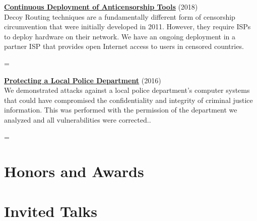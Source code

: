 \documentclass[margin,11pt]{res} %
\newenvironment{absolutelynopagebreak}
  {\par\nobreak\vfil\penalty0\vfilneg
   \vtop\bgroup}
  {\par\xdef\tpd{\the\prevdepth}\egroup
   \prevdepth=\tpd}
\begin{document}
{{{{\begin{samepage}
\begin{absolutelynopagebreak}
\textbf{\href{https://refraction.networking}{Continuous Deployment of Anticensorship Tools}} (2018)\\
Decoy Routing techniques are a fundamentally different form of censorship circumvention that were initially developed in 2011. However, they require ISPs to deploy hardware on their network. We have an ongoing deployment in a partner ISP that provides open Internet access to users in censored countries.
\end{absolutelynopagebreak}
\end{samepage}

\begin{samepage}
\begin{absolutelynopagebreak}
\textbf{\href{https://benvds.com/papers/police.pdf}{Protecting a Local Police Department}} (2016)\\
We demonstrated attacks against a local police department's computer systems that could have compromised the confidentiality and integrity of criminal justice information. This was performed with the permission of the department we analyzed and all vulnerabilities were corrected..
\end{absolutelynopagebreak}
\end{samepage}


\vspace{6pt}
\section{\large Honors and Awards}

{%
{%


\vspace{6pt}
\section{\large Invited Talks}

{%
{%
{%
{%

}}}}}}}}}}
\end{document}
